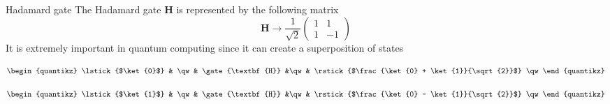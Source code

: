 \documentclass[11p,aspectratio=169]{beamer}
\begin{document}
\begin{frame}{Hadamard gate}
    The Hadamard gate $\textbf{H}$ is represented by the following matrix 
    $$ \textbf{H} \rightarrow \frac{1}{\sqrt{2}}
    \begin{pmatrix}
       1 & 1 \\
       1 & -1  
    \end{pmatrix}
    $$
    It is extremely important in quantum computing since it can create a superposition of states

    $$
    \begin{quantikz}
        \lstick{$\ket{0}$} & \qw & \gate{\textbf{H}} &\qw
        & \rstick{$\frac{\ket{0} + \ket{1}}{\sqrt{2}}$} \qw
        \end{quantikz}
        $$

        $$
    \begin{quantikz}
        \lstick{$\ket{1}$} & \qw & \gate{\textbf{H}} &\qw
        & \rstick{$\frac{\ket{0} - \ket{1}}{\sqrt{2}}$} \qw
        \end{quantikz}
        $$
\end{frame}
\end{document}
